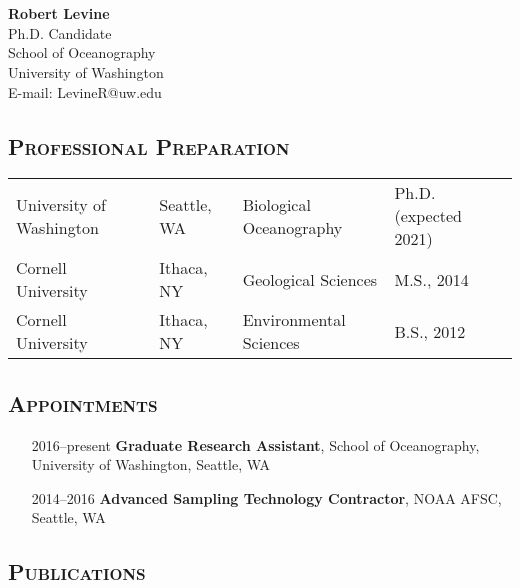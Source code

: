 \documentclass[svgnames,12pt,a4paper]{article}
\date{}
\author{}
\let\origsection\section%
\let\section\subsubsection%
\let\section\origsection%
\begin{document}
\section*{}
\textbf{\large{Robert Levine}}\\
Ph.D. Candidate\\
School of Oceanography\\
University of Washington\\
E-mail: LevineR@uw.edu\\
\vspace*{-.7cm}

\subsection*{\textsc{Professional Preparation}}
\begin{tabular}{ l l l l }
 University of Washington & Seattle, WA & Biological Oceanography & Ph.D. (expected 2021) \\
 Cornell University & Ithaca, NY & Geological Sciences & M.S., 2014 \\
 Cornell University & Ithaca, NY & Environmental Sciences & B.S., 2012 \\
\end{tabular}
\vspace*{-.5cm}

\subsection*{\textsc{Appointments}}
\vspace*{-.2cm}
\begin{itemize}[label={--9999:},leftmargin=*,itemsep=-3pt]
\item[2016--present]
    \textbf{Graduate Research Assistant},
    School of Oceanography, University of Washington, Seattle, WA
\item[2014--2016]
    \textbf{Advanced Sampling Technology Contractor},
    NOAA AFSC, Seattle, WA
\end{itemize}

\vspace*{-.7cm}
\subsection*{\textsc{Publications}}
\vspace*{-.2cm}
\vspace*{-.8cm}
\end{document}
